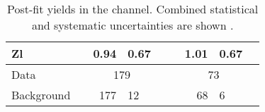 \begin{table}[!htpb]
\begin{tabular}{ l | r @{$\pm$} l  r @{$\pm$} l  r @{$\pm$} l | r @{$\pm$} l  r @{$\pm$} l  r @{$\pm$} l }
    Zl     & \multicolumn{2}{c}{} & 0.94 & 0.67  & \multicolumn{2}{c|}{} & \multicolumn{2}{c}{} & 1.01 & 0.67 & \multicolumn{2}{c}{}\\
    \hline
    Data & \multicolumn{2}{c}{} & \multicolumn{2}{c}{179} & \multicolumn{2}{c|}{} & \multicolumn{2}{c}{} & \multicolumn{2}{c}{73} & \multicolumn{2}{c}{}\\
    Background & \multicolumn{2}{c}{}  & 177 & 12 & \multicolumn{2}{c|}{} & \multicolumn{2}{c}{} & 68 & 6 & \multicolumn{2}{c}{}\\
    \hline\bottomrule
    \end{tabular}
    \caption{Post-fit yields in the \tlep channel. Combined statistical and systematic uncertainties are shown \cite{Dao:2688371}. }
    \label{tab:postfityield2L}
\end{table}
